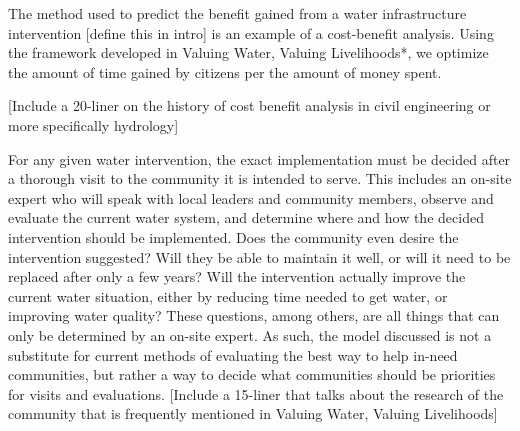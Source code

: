 The method used to predict the benefit gained from a water infrastructure intervention [define this in intro] is an example of a cost-benefit analysis. Using the framework developed in Valuing Water, Valuing Livelihoods*, we optimize the amount of time gained by citizens per the amount of money spent.

[Include a 20-liner on the history of cost benefit analysis in civil engineering or more specifically hydrology]

For any given water intervention, the exact implementation must be decided after a thorough visit to the community it is intended to serve.
This includes an on-site expert who will speak with local leaders and community members, observe and evaluate the current water system, and determine where and how the decided intervention should be implemented.
Does the community even desire the intervention suggested?
Will they be able to maintain it well, or will it need to be replaced after only a few years?
Will the intervention actually improve the current water situation, either by reducing time needed to get water, or improving water quality?
These questions, among others, are all things that can only be determined by an on-site expert.
As such, the model discussed is not a substitute for current methods of evaluating the best way to help in-need communities, but rather a way to decide what communities should be priorities for visits and evaluations.
[Include a 15-liner that talks about the research of the community that is frequently mentioned in Valuing Water, Valuing Livelihoods]
